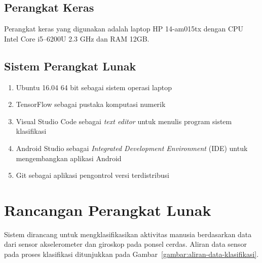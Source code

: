 \subsection{Perangkat Keras}
Perangkat keras yang digunakan adalah laptop HP 14-am015tx dengan CPU Intel Core i5--6200U 2.3 GHz dan RAM 12GB\@.

\subsection{Sistem Perangkat Lunak}
\begin{enumerate}
    \item Ubuntu 16.04 64 bit sebagai sistem operasi laptop
    \item TensorFlow sebagai pustaka komputasi numerik
    \item Visual Studio Code sebagai \textit{text editor} untuk menulis program sistem klasifikasi
    \item Android Studio sebagai \textit{Integrated Development Environment} (IDE) untuk mengembangkan aplikasi Android
    \item Git sebagai aplikasi pengontrol versi terdistribusi
\end{enumerate}

%
%
\section{Rancangan Perangkat Lunak}
Sistem dirancang untuk mengklasifikasikan aktivitas manusia berdasarkan data dari sensor akselerometer dan giroskop pada ponsel cerdas. Aliran data sensor pada proses klasifikasi ditunjukkan pada Gambar~\ref{gambar:aliran-data-klasifikasi}.

